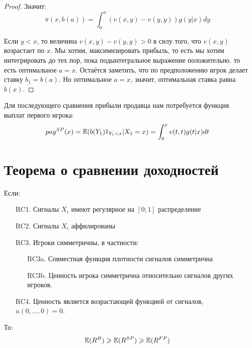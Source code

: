 \begin{itemize}
\begin{proof}
Значит:
\begin{equation}
\pi(x,b(a))=\int_{0}^{a}(v(x,y)-v(y,y)) g(y|x)dy
\end{equation}

Если $ y<x $, то величина $ v(x,y)-v(y,y)>0 $ в силу того, что $ v(x,y) $ возрастает по $ x $. Мы хотим, максимизировать прибыль, то есть мы хотим интегрировать до тех пор, пока подынтегральное выражение положительно. то есть оптимальное $ a=x $. Остаётся заметить, что по предположению игрок делает ставку $ b_{1}=b(a) $. Но оптимальное $ a=x $, значит, оптимальная ставка равна $ b(x) $.


\end{proof}


Для последующего сравнения прибыли продавца нам потребуется функция выплат первого игрока:
\begin{equation}
pay^{SP}(x)=\mathbb{E}(b(Y_{1})1_{Y_{1}<x}|X_{1}=x)=\int_{0}^{x}v(t,t)g(t|x)dt
\end{equation}





\end{itemize}



\section{Теорема о сравнении доходностей}


\begin{myth}
Если:

\begin{enumerate}
\item[RC1.] Сигналы $ X_{i} $ имеют регулярное на $ [0;1] $ распределение
\item[RC2.] Сигналы $ X_{i} $ аффилированы
\item[RC3.] Игроки симметричны, в частности:
\begin{enumerate}
\item[RC3a.] Совместная функция плотности сигналов симметрична
\item[RC3b.] Ценность игрока симметрична относительно сигналов других игроков.
\end{enumerate}
\item[RC4.] Ценность является возрастающей функцией от сигналов, $ u(0,\ldots,0)=0 $.

\end{enumerate}

То:
\begin{equation}
\mathbb{E}(R^{B})\geqslant \mathbb{E}(R^{SP})\geqslant \mathbb{E}(R^{FP})
\end{equation}

\end{myth}

